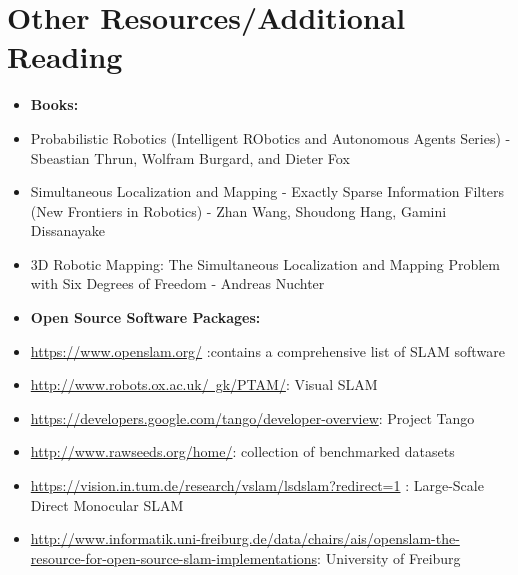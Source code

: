 \documentclass[twoside]{article}
\begin{document}
\section {Other Resources/Additional Reading}
\begin{itemize}
    \item \textbf{Books:}
    \item Probabilistic Robotics (Intelligent RObotics and Autonomous Agents Series) - Sbeastian Thrun, Wolfram Burgard, and Dieter Fox
    \item Simultaneous Localization and Mapping - Exactly Sparse Information Filters (New Frontiers in Robotics) - Zhan Wang, Shoudong Hang, Gamini Dissanayake
    \item 3D Robotic Mapping: The Simultaneous Localization and Mapping Problem with Six Degrees of Freedom - Andreas Nuchter
\item \textbf{Open Source Software Packages:}
    \item \href{https://www.openslam.org/}{https://www.openslam.org/} :contains a comprehensive list of SLAM software
    \item \href{http://www.robots.ox.ac.uk/~gk/PTAM/}{http://www.robots.ox.ac.uk/~gk/PTAM/}: Visual SLAM
    \item \href{https://developers.google.com/tango/developer-overview}{https://developers.google.com/tango/developer-overview}: Project Tango
    \item \href{http://www.rawseeds.org/home/}{http://www.rawseeds.org/home/}: collection of benchmarked datasets
    \item \href{https://vision.in.tum.de/research/vslam/lsdslam?redirect=1}{https://vision.in.tum.de/research/vslam/lsdslam?redirect=1} : Large-Scale Direct Monocular SLAM
    \item \href{http://www.informatik.uni-freiburg.de/data/chairs/ais/openslam-the-resource-for-open-source-slam-implementations}{http://www.informatik.uni-freiburg.de/data/chairs/ais/openslam-the-resource-for-open-source-slam-implementations}: University of Freiburg
\end{itemize}
\end{document}
